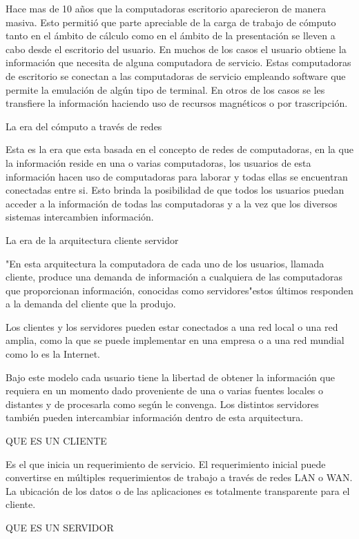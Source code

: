 Hace mas de 10 años que la computadoras escritorio aparecieron de manera masiva. Esto permitió que parte apreciable de la 
carga de trabajo de cómputo tanto en el ámbito de cálculo como en el ámbito de la presentación se lleven a cabo desde el 
escritorio del usuario. En muchos de los casos el usuario obtiene la información que necesita de alguna computadora de servicio. 
Estas computadoras de escritorio se conectan a las computadoras de servicio empleando software que permite la emulación de algún 
tipo de terminal. En otros de los casos se les transfiere la información haciendo uso de recursos magnéticos o por trascripción.

La era del cómputo a través de redes

Esta es la era que esta basada en el concepto de redes de computadoras, en la que la información reside en una o varias computadoras, 
los usuarios de esta información hacen uso de computadoras para laborar y todas ellas se encuentran conectadas entre si. Esto brinda 
la posibilidad de que todos los usuarios puedan acceder a la información de todas las computadoras y a la vez que los diversos sistemas
intercambien información.


La era de la arquitectura cliente servidor

"En esta arquitectura la computadora de cada uno de los usuarios, llamada cliente, produce una demanda de información a cualquiera de 
las computadoras que proporcionan información, conocidas como servidores"estos últimos responden a la demanda del cliente que la produjo.

Los clientes y los servidores pueden estar conectados a una red local o una red amplia, como la que se puede implementar en una empresa 
o a una red mundial como lo es la Internet.

Bajo este modelo cada usuario tiene la libertad de obtener la información que requiera en un momento dado proveniente de una o varias 
fuentes locales o distantes y de procesarla como según le convenga. Los distintos servidores también pueden intercambiar información 
dentro de esta arquitectura.



QUE ES UN CLIENTE

Es el que inicia un requerimiento de servicio. El requerimiento inicial puede convertirse en múltiples requerimientos de trabajo a 
través de redes LAN o WAN. La ubicación de los datos o de las aplicaciones es totalmente transparente para el cliente.

QUE ES UN SERVIDOR

